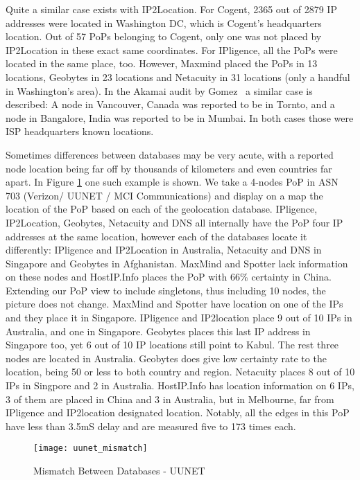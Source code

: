 Quite a similar case exists with IP2Location. For Cogent, 2365 out
of 2879 IP addresses were located in Washington DC, which is
Cogent's headquarters location. Out of 57 PoPs belonging to Cogent,
only one was not placed by IP2Location in these exact same
coordinates. For IPligence, all the PoPs were located in the same
place, too. However, Maxmind placed the PoPs in 13 locations,
Geobytes in 23 locations and Netacuity in 31 locations (only a
handful in Washington's area).
In the Akamai audit by Gomez~\cite{akamai_audit} a similar case
is described: A node in Vancouver, Canada was reported to be in
Tornto, and a node in Bangalore, India was reported to be in Mumbai.
In both cases those were ISP headquarters known locations.

Sometimes differences between databases may be very acute, with a
reported node location being far off by thousands of kilometers and
even countries far apart. In Figure \ref{fig:uunet_mismatch} one
such example is shown. We take a 4-nodes PoP in ASN 703 (Verizon/
UUNET / MCI Communications) and display on a map the location of the
PoP based on each of the geolocation database. IPligence,
IP2Location, Geobytes, Netacuity and DNS all internally have the PoP
four IP addresses at the same location, however each of the
databases locate it differently: IPligence and IP2Location in
Australia, Netacuity and DNS in Singapore and Geobytes in
Afghanistan. MaxMind and Spotter lack information on these nodes and
HostIP.Info places the PoP with 66\% certainty in China. Extending
our PoP view to include singletons, thus including 10 nodes, the
picture does not change.  MaxMind and Spotter have location on one
of the IPs and they place it in Singapore. IPligence and IP2location
place 9 out of 10 IPs in Australia, and one in Singapore. Geobytes
places this last IP address in Singapore too, yet 6 out of 10 IP
locations still point to Kabul. The rest three nodes are located in
Australia. Geobytes does give low certainty rate to the location,
being 50 or less to both country and region. Netacuity places 8 out
of 10 IPs in Singpore and 2 in Australia. HostIP.Info has location
information on 6 IPs, 3 of them are placed in China and 3 in
Australia, but in Melbourne, far from IPligence and IP2location
designated location. Notably, all the edges in this PoP have less
than 3.5mS delay and are measured five to 173 times each.


\begin{figure}
\begin{minipage}[b]{\linewidth}
\centering
\texttt{[image: uunet\_mismatch]}
\caption{Mismatch Between Databases - UUNET }
\label{fig:uunet_mismatch}
\end{minipage}
\end{figure}


